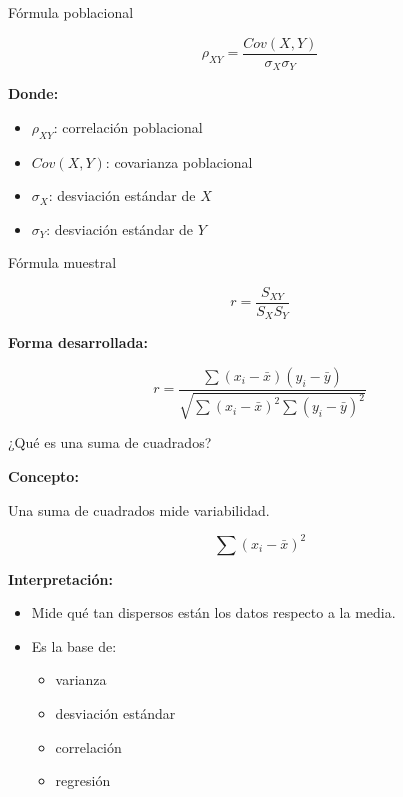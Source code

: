 \documentclass{beamer}
\begin{document}
\begin{frame}{Fórmula poblacional}

\[
\rho_{XY}
=
\frac{
Cov(X,Y)
}{
\sigma_X \sigma_Y
}
\]

\vspace{0.4cm}

\textbf{Donde:}

\begin{itemize}
\item \(\rho_{XY}\): correlación poblacional
\item \(Cov(X,Y)\): covarianza poblacional
\item \(\sigma_X\): desviación estándar de \(X\)
\item \(\sigma_Y\): desviación estándar de \(Y\)
\end{itemize}

\end{frame}

\begin{frame}{Fórmula muestral}

\[
r
=
\frac{
S_{XY}
}{
S_X S_Y
}
\]

\vspace{0.4cm}

\textbf{Forma desarrollada:}

\[
r=
\frac{
\sum (x_i-\bar{x})(y_i-\bar{y})
}{
\sqrt{
\sum (x_i-\bar{x})^2
\sum (y_i-\bar{y})^2
}
}
\]

\end{frame}

\begin{frame}{¿Qué es una suma de cuadrados?}

\textbf{Concepto:}

Una suma de cuadrados mide variabilidad.

\vspace{0.4cm}

\[
\sum (x_i-\bar{x})^2
\]

\vspace{0.4cm}

\textbf{Interpretación:}

\begin{itemize}
\item Mide qué tan dispersos están los datos respecto a la media.
\item Es la base de:
\begin{itemize}
\item varianza
\item desviación estándar
\item correlación
\item regresión
\end{itemize}
\end{itemize}

\end{frame}
\end{document}
